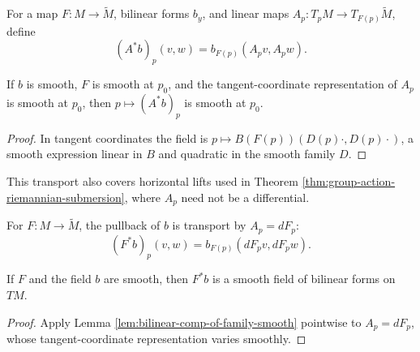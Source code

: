 \begin{definition}
\label{def:bilinear-comp-of-family}




For a map $F:M\to\widetilde M$, bilinear forms $b_y$, and linear maps $A_p:T_pM\to T_{F(p)}\widetilde M$, define
\[
(A^*b)_p(v,w)=b_{F(p)}(A_pv,A_pw).
\]
\end{definition}

\begin{lemma}
\label{lem:bilinear-comp-of-family-smooth}





If $b$ is smooth, $F$ is smooth at $p_0$, and the tangent-coordinate representation of $A_p$ is smooth at $p_0$, then $p\mapsto(A^*b)_p$ is smooth at $p_0$.
\end{lemma}
\begin{proof}

\sketch In tangent coordinates the field is $p\mapsto B(F(p))(D(p)\cdot,D(p)\cdot)$, a smooth expression linear in $B$ and quadratic in the smooth family $D$.
\end{proof}

This transport also covers horizontal lifts used in Theorem \ref{thm:group-action-riemannian-submersion}, where $A_p$ need not be a differential.

\begin{definition}
\label{def:pullback-form-of-family}





For $F:M\to\widetilde M$, the pullback of $b$ is transport by $A_p=dF_p$:
\[
(F^*b)_p(v,w)=b_{F(p)}(dF_pv,dF_pw).
\]
\end{definition}

\begin{lemma}
\label{lem:pullback-form-of-family-smooth}





If $F$ and the field $b$ are smooth, then $F^*b$ is a smooth field of bilinear forms on $TM$.
\end{lemma}
\begin{proof}

\sketch Apply Lemma \ref{lem:bilinear-comp-of-family-smooth} pointwise to $A_p=dF_p$, whose tangent-coordinate representation varies smoothly.
\end{proof}

